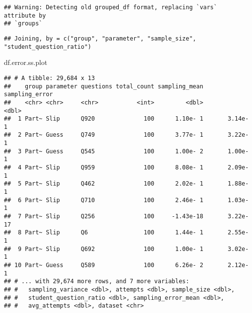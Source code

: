 \documentclass[]{article}
\newenvironment{Shaded}{\begin{snugshade}}{\end{snugshade}}
\newcommand{\DataTypeTok}[1]{\textcolor[rgb]{0.13,0.29,0.53}{#1}}
\newcommand{\KeywordTok}[1]{\textcolor[rgb]{0.13,0.29,0.53}{\textbf{#1}}}
\newcommand{\NormalTok}[1]{#1}
\newcommand{\OperatorTok}[1]{\textcolor[rgb]{0.81,0.36,0.00}{\textbf{#1}}}
\newcommand{\StringTok}[1]{\textcolor[rgb]{0.31,0.60,0.02}{#1}}
\begin{document}
\begin{verbatim}
## Warning: Detecting old grouped_df format, replacing `vars` attribute by
## `groups`
\end{verbatim}

\begin{Shaded}
\end{Shaded}

\begin{verbatim}
## Joining, by = c("group", "parameter", "sample_size", "student_question_ratio")
\end{verbatim}

\begin{Shaded}
\begin{Highlighting}[]
\NormalTok{df.error.ss.plot}
\end{Highlighting}
\end{Shaded}

\begin{verbatim}
## # A tibble: 29,684 x 13
##    group parameter questions total_count sampling_mean sampling_error
##    <chr> <chr>     <chr>           <int>         <dbl>          <dbl>
##  1 Part~ Slip      Q920              100      1.10e- 1       3.14e- 1
##  2 Part~ Guess     Q749              100      3.77e- 1       3.22e- 1
##  3 Part~ Guess     Q545              100      1.00e- 2       1.00e- 1
##  4 Part~ Slip      Q959              100      8.08e- 1       2.09e- 1
##  5 Part~ Slip      Q462              100      2.02e- 1       1.88e- 1
##  6 Part~ Slip      Q710              100      2.46e- 1       1.03e- 1
##  7 Part~ Slip      Q256              100     -1.43e-18       3.22e-17
##  8 Part~ Slip      Q6                100      1.44e- 1       2.55e- 1
##  9 Part~ Slip      Q692              100      1.00e- 1       3.02e- 1
## 10 Part~ Guess     Q589              100      6.26e- 2       2.12e- 1
## # ... with 29,674 more rows, and 7 more variables:
## #   sampling_variance <dbl>, attempts <dbl>, sample_size <dbl>,
## #   student_question_ratio <dbl>, sampling_error_mean <dbl>,
## #   avg_attempts <dbl>, dataset <chr>
\end{verbatim}
\end{document}
